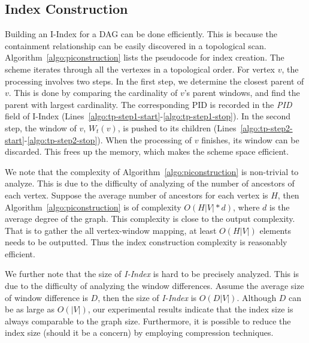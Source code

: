 \subsection{Index Construction} 
Building an I-Index for a DAG
can be done efficiently. 
This is because the containment relationship can be easily 
discovered in a topological scan.
Algorithm~\ref{algo:piconstruction} lists the pseudocode for 
index creation. 
The scheme iterates through all the vertexes in a topological order.
For vertex $v$, the processing involves two steps.
In the first step, we determine the closest parent
of $v$. This is done by comparing the cardinality of $v$'s parent windows,
and find the parent with largest cardinality. 
The corresponding PID is recorded in the \emph{PID} field of 
I-Index (Lines~\ref{algo:tp-step1-start}-\ref{algo:tp-step1-stop}). 
In the second step, the window of $v$, $W_t(v)$, is pushed to 
its children (Lines~\ref{algo:tp-step2-start}-\ref{algo:tp-step2-stop}). 
When the processing of $v$ finishes, its window can be discarded. This
frees up the memory, which makes the scheme space efficient.

We note that the complexity of Algorithm~\ref{algo:piconstruction} is non-trivial to analyze. 
This is due to the difficulty of analyzing of the number of ancestors of each vertex. Suppose the 
average number of ancestors for each vertex is $H$, then Algorithm~\ref{algo:piconstruction} is of
complexity $O(H|V|*d)$, where $d$ is the average degree of the graph. This complexity is close to the
output complexity. That is to gather the all vertex-window mapping, at least $O(H|V|)$ elements needs
to be outputted. Thus the index construction complexity is reasonably efficient.

We further note that the size of \emph{I-Index} is hard to be precisely analyzed. 
This is due to the difficulty of analyzing the window differences.
Assume the average size of window difference
is $D$, then the size of \emph{I-Index} is $O(D|V|)$. Although $D$ can be as large as $O(|V|)$, our 
experimental results indicate that the index size is always 
comparable to the graph size. Furthermore, it is possible to
reduce the index size (should it be a concern) by employing
compression techniques. 

